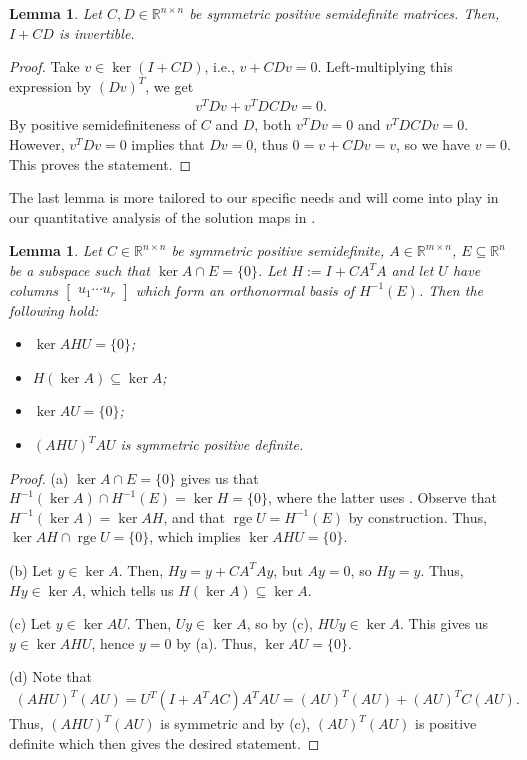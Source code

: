 \documentclass[reqno]{amsart}
\newtheorem{lemma}[proposition]{Lemma}
\numberwithin{equation}{section}
\newcommand{\R}{\mathbb{R}}
\newcommand{\rge}{\operatorname{rge}}
\begin{document}
\begin{lemma}\label{lem:Hinvert}
    Let $C, D \in \R^{n \times n}$ be symmetric positive semidefinite matrices.
    Then, $I + CD$ is invertible.
\end{lemma}

\begin{proof}
    Take $v \in \ker (I + CD)$, i.e., $v + CDv = 0$.
    Left-multiplying this expression by $(Dv)^T$, we get \begin{align*}
        v^TDv + v^TDCDv = 0.
    \end{align*} By positive semidefiniteness of $C$ and $D$,
    both $v^TDv=0$ and $v^TDCDv=0$.  However, $v^TDv = 0$
    implies that $Dv=0$, thus $0=v + CDv = v$, so we
    have $v = 0$. This proves the statement.
\end{proof}

\noindent
The last lemma is more tailored to our specific needs and will come into play in our quantitative analysis of the solution maps in .

\begin{lemma}\label{lem:AHUinvert}
    Let $C \in \R^{n \times n}$ be symmetric positive semidefinite, $A \in \R^{m \times n}$, $E \subseteq \R^n$
    be a subspace such that $\ker A \cap E = \{0\}$. Let $H := I + CA^TA$ and let $U$
    have columns $\begin{bmatrix}
        u_1 \cdots u_r
    \end{bmatrix}$ which form an orthonormal basis of $H^{-1}(E)$.
    Then the following hold:
    \begin{itemize}
        \item[(a)] $\ker AHU = \{0\}$;
        \item[(b)] $H(\ker A) \subseteq \ker A$;
        \item[(c)] $\ker AU = \{0\}$;
        \item[(d)] $(AHU)^T AU$ is symmetric positive definite.
    \end{itemize}
\end{lemma}

\begin{proof}
    (a) $\ker A \cap E = \{0\}$ gives us that $H^{-1} (\ker A) \cap H^{-1}(E) = \ker H=\{0\}$,  where the latter uses . Observe that  
    $H^{-1}(\ker A)=\ker AH$,   and that $\rge U =H^{-1}(E)$ by construction.  Thus,  $\ker AH \cap \rge U = \{0\}$, which implies $\ker AHU = \{0\}$.

    (b) Let $y \in \ker A$. Then, $Hy = y + C A^TAy$, but $Ay = 0$, so $Hy = y$. Thus, $Hy \in \ker A$,
    which tells us $H(\ker A) \subseteq \ker A$.

    (c) Let $y \in \ker AU$. Then, $Uy \in \ker A$, so by (c), $HUy \in \ker A$.
    This gives us $y \in \ker AHU$, hence $y=0$ by (a). Thus, $\ker AU = \{0\}$.

(d) 
Note that
 \begin{align*}
   (AHU)^T (AU) = U^T \left(I + A^TA C\right) A^TAU = (AU)^T(AU) + (AU)^TC(AU).
 \end{align*} 
Thus, $(AHU)^T (AU)$ is symmetric and  by (c),  $(AU)^T(AU)$ is positive definite which then gives the desired statement.
\end{proof}
\end{document}
